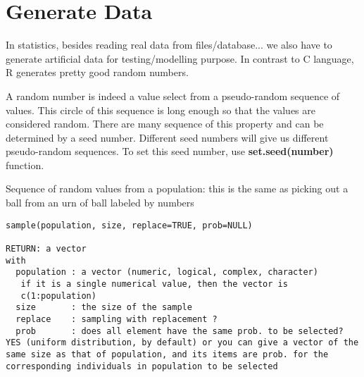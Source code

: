 
\chapter{Generate Data}
\label{chap:generate-data}

In statistics, besides reading real data from files/database... we
also have to generate artificial data for testing/modelling
purpose. In contrast to C language, R generates pretty good random
numbers. 

A random number is indeed a value select from a pseudo-random sequence
of values. This circle of this sequence is long enough so that the
values are considered random. There are many sequence of this property
and can be determined by a seed number. Different seed numbers will
give us different pseudo-random sequences. To set this seed number,
use {\bf set.seed(number)} function.

\textbullet Sequence of random values from a population: this is the
same as picking out a ball from an urn of ball labeled by numbers
\begin{lstlisting}
sample(population, size, replace=TRUE, prob=NULL)

RETURN: a vector
with 
  population : a vector (numeric, logical, complex, character) 
   if it is a single numerical value, then the vector is
   c(1:population)
  size       : the size of the sample
  replace    : sampling with replacement ? 
  prob       : does all element have the same prob. to be selected?
YES (uniform distribution, by default) or you can give a vector of the
same size as that of population, and its items are prob. for the
corresponding individuals in population to be selected
\end{lstlisting}

